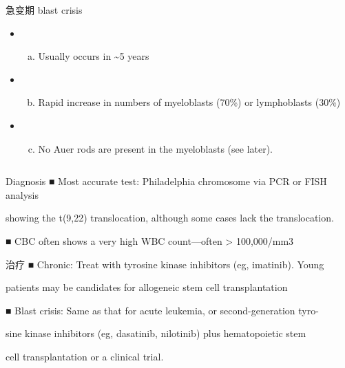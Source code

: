 \documentclass[
  ignorenonframetext,
]{beamer}
\providecommand{\tightlist}{%
  \setlength{\itemsep}{0pt}\setlength{\parskip}{0pt}}
\begin{document}
\begin{frame}
\begin{columns}[T]
\begin{column}{0.3\textwidth}
\begin{block}{急变期 blast crisis}
\protect\hypertarget{ux6025ux53d8ux671f-blast-crisis}{}
\begin{itemize}
\item
  \begin{enumerate}
  [(a)]
  \tightlist
  \item
    Usually occurs in \textasciitilde5 years
  \end{enumerate}
\item
  \begin{enumerate}
  [(a)]
  \setcounter{enumi}{1}
  \tightlist
  \item
    Rapid increase in numbers of myeloblasts (70\%) or lymphoblasts
    (30\%)
  \end{enumerate}
\item
  \begin{enumerate}
  [(a)]
  \setcounter{enumi}{2}
  \tightlist
  \item
    No Auer rods are present in the myeloblasts (see later).
  \end{enumerate}
\end{itemize}
\end{block}
\end{column}
\end{columns}
\end{frame}

\begin{frame}
\begin{block}{Diagnosis}
\protect\hypertarget{diagnosis-1}{}
■ Most accurate test: Philadelphia chromosome via PCR or FISH analysis

showing the t(9,22) translocation, although some cases lack the
translocation.

■ CBC often shows a very high WBC count---often \textgreater{}
100,000/mm3
\end{block}
\end{frame}

\begin{frame}
\begin{block}{治疗}
\protect\hypertarget{ux6cbbux7597-2}{}
■ Chronic: Treat with tyrosine kinase inhibitors (eg, imatinib). Young

patients may be candidates for allogeneic stem cell transplantation

■ Blast crisis: Same as that for acute leukemia, or second-generation
tyro-

sine kinase inhibitors (eg, dasatinib, nilotinib) plus hematopoietic
stem

cell transplantation or a clinical trial.
\end{block}
\end{frame}
\end{document}
